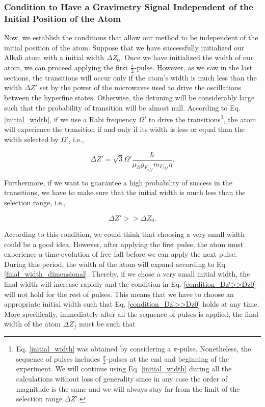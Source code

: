 \documentclass{article}
\begin{document}
\subsubsection{Condition to Have a Gravimetry Signal Independent of the Initial Position of the Atom}
Now, we establish the conditions that allow our method to be independent of the initial position of the atom.
Suppose that we have successfully initialized our Alkali atom with a initial width $\Delta Z_{0}$. Once we have initialized the width of our atom, we can proceed applying the first $\frac{\pi}{2}$-pulse. However, as we saw in the last sections, the transitions will occur only if the atom's width is much less than the width $\Delta Z'$ set by the power of the microwaves used to drive the oscillations between the hyperfine states. Otherwise, the detuning will be considerably large such that the probability of transition will be almost null. According to Eq. \ref{initial_width}, if we use a Rabi frequency $\Omega'$ to drive the transitions\footnote{Eq. \ref{initial_width} was obtained by considering a $\pi$-pulse. Nonetheless, the sequence of pulses includes $\frac{\pi}{2}$-pulses at the end and beginning of the experiment. We will continue using Eq. \ref{initial_width} during all the calculations without loss of generality since in any case the order of magnitude is the same and we will always stay far from the limit of the selection range $\Delta Z'$.}, the atom will experience the transition if and only if its width is less or equal than the width selected by $\Omega'$, i.e.,

\begin{equation}\label{maximum_width_rabi_frequency}
    \Delta Z' = \sqrt{3} \Omega' \frac{\hbar}{\mu_{B} g_{F_{eff}} m_{F_{eff}} \eta}.
\end{equation}

Furthermore, if we want to guarantee a high probability of success in the transitions, we have to make sure that the initial width is much less than the selection range, i.e.,

\begin{equation}\label{condition_Dz'>>Dz0}
    \Delta Z' >> \Delta Z_{0}.
\end{equation}

According to this condition, we could think that choosing a very small width could be a good idea. However, after applying the first pulse, the atom must experience a time-evolution of free fall before we can apply the next pulse. During this period, the width of the atom will expand according to Eq. \ref{final_width_dimensional}. Thereby, if we chose a very small initial width, the final width will increase rapidly and the condition in Eq. \ref{condition_Dz'>>Dz0} will not hold for the rest of pulses. This means that we have to choose an appropriate initial width such that Eq. \ref{condition_Dz'>>Dz0} holds at any time. More specifically, immediately after all the sequence of pulses is applied, the final width of the atom $\Delta Z_{f}$ must be such that
\end{document}
